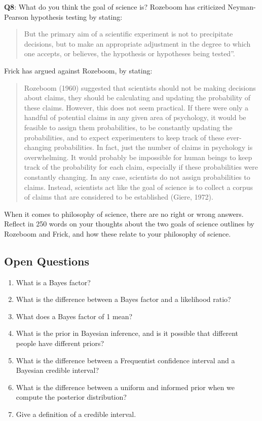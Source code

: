 \documentclass[
  oneside]{book}
\begin{document}
\textbf{Q8}: What do you think the goal of science is? Rozeboom \citeyearpar{rozeboom_fallacy_1960} has criticized Neyman-Pearson hypothesis testing by stating:

\begin{quote}
But the primary aim of a scientific experiment is not to precipitate decisions, but to make an appropriate adjustment in the degree to which one accepts, or believes, the hypothesis or hypotheses being tested''.
\end{quote}

Frick \citeyearpar{frick_appropriate_1996} has argued against Rozeboom, by stating:

\begin{quote}
Rozeboom (1960) suggested that scientists should not be making decisions about claims, they should be calculating and updating the probability of these claims. However, this does not seem practical. If there were only a handful of potential claims in any given area of psychology, it would be feasible to assign them probabilities, to be constantly updating the probabilities, and to expect experimenters to keep track of these ever-changing probabilities. In fact, just the number of claims in psychology is overwhelming. It would probably be impossible for human beings to keep track of the probability for each claim, especially if these probabilities were constantly changing. In any case, scientists do not assign probabilities to claims. Instead, scientists act like the goal of science is to collect a corpus of claims that are considered to be established (Giere, 1972).
\end{quote}

When it comes to philosophy of science, there are no right or wrong answers. Reflect in 250 words on your thoughts about the two goals of science outlines by Rozeboom and Frick, and how these relate to your philosophy of science.

\hypertarget{open-questions-3}{%
\subsection{Open Questions}\label{open-questions-3}}

\begin{enumerate}
\def\labelenumi{\arabic{enumi}.}
\item
  What is a Bayes factor?
\item
  What is the difference between a Bayes factor and a likelihood ratio?
\item
  What does a Bayes factor of 1 mean?
\item
  What is the prior in Bayesian inference, and is it possible that different people have different priors?
\item
  What is the difference between a Frequentist confidence interval and a Bayesian credible interval?
\item
  What is the difference between a uniform and informed prior when we compute the posterior distribution?
\item
  Give a definition of a credible interval.
\end{enumerate}
\end{document}
